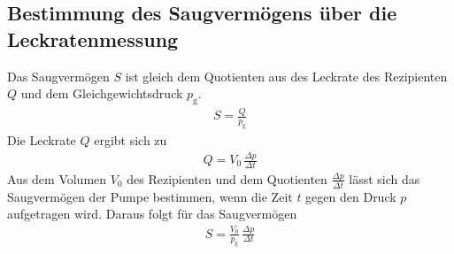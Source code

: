 \subsection{Bestimmung des Saugvermögens über die Leckratenmessung}
Das Saugvermögen $S$ ist gleich dem Quotienten aus des Leckrate des Rezipienten $Q$ und dem Gleichgewichtsdruck $p_\text{g}$.
\begin{align}
   S = \frac{Q}{p_\text{g}}
\end{align}
Die Leckrate $Q$ ergibt sich zu
\begin{align}
   Q = V_0\, \frac{\Delta p}{\Delta t}
\end{align}
Aus dem Volumen $V_0$ des Rezipienten und dem Quotienten $\frac{\Delta p}{\Delta t}$ lässt sich das Saugvermögen der Pumpe bestimmen, wenn die Zeit $t$ gegen den Druck $p$ aufgetragen wird. Daraus folgt für das Saugvermögen
\begin{align}\label{eqn:SaugLeck}
   S = \frac{V_0}{p_\text{g}}\, \frac{\Delta p}{\Delta t}
\end{align}
